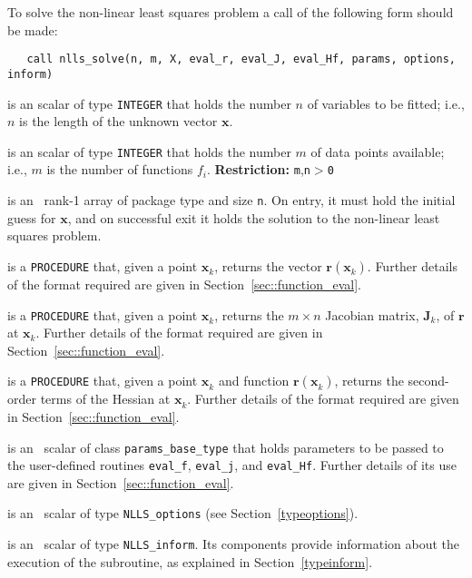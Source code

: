 \documentclass{spec}
\newcommand{\scalarintegerii}{is an \intentin scalar of type {\tt INTEGER} }
\newcommand{\vx}{ {\bm x} } %
\newcommand{\vr}{ {\bm r} } %
\newcommand{\vJ}{ {\bm J} } %
\newcommand{\iter}[2][k]{ #2_{#1}^{}} %
\begin{document}
To solve the non-linear least squares problem a call of the following form should be made:

\begin{verbatim}
   call nlls_solve(n, m, X, eval_r, eval_J, eval_Hf, params, options, inform)
\end{verbatim}

\begin{description}
 \scalarintegerii that holds the number $n$ of
variables to be fitted; i.e., $n$ is the length of the unknown vector $\bm x$.

 \scalarintegerii that holds the number $m$ of
data points available; i.e., $m$ is the number of functions $f_i$.
\textbf{Restriction:} \texttt{m},\texttt{n}$>$\texttt{0}

 is an \intentinout\  rank-1 array of package type
and size {\tt n}.  On entry, it must hold the initial guess for $\bm x$, and on
successful exit it holds the solution to the non-linear least squares problem.

 is a {\tt PROCEDURE} that, given a point $\iter{\vx}$, returns the vector $\vr(\iter{\vx})$.
Further details of the format required are given in Section~\ref{sec::function_eval}.

 is a {\tt PROCEDURE} that, given a point $\iter{\vx}$,
returns the $m \times n$ Jacobian matrix, $\iter{\vJ}$, of $\vr$ at $\iter{\vx}$.
Further details of the format required are given in Section~\ref{sec::function_eval}.

 is a {\tt PROCEDURE} that, given a point $\iter{\vx}$
and function $\vr(\iter{\vx})$, returns the second-order terms of the Hessian at $\iter{\vx}$.
Further details of the format required are given in Section~\ref{sec::function_eval}.

 is an \intentin\ scalar of class {\tt params\_base\_type} that holds parameters to
be passed to the user-defined routines {\tt eval\_f}, {\tt eval\_j}, and {\tt eval\_Hf}.
Further details of its use are given in Section~\ref{sec::function_eval}.

is an \intentin\  scalar  of type {\tt NLLS\_options}
(see Section~\ref{typeoptions}).

 is an \intentinout\ scalar of type
{\tt NLLS\_inform}. Its components provide information about the execution
of the subroutine, as explained in Section~\ref{typeinform}.


\end{description}
\end{document}
